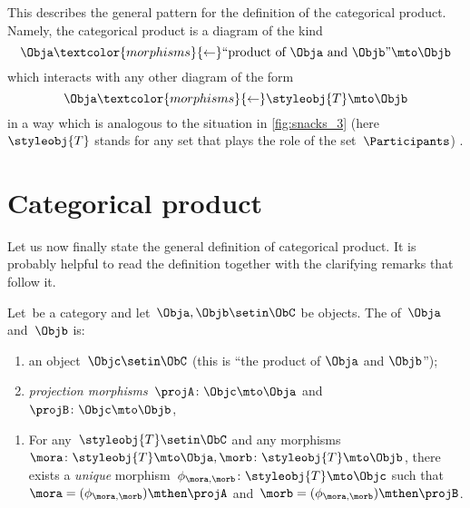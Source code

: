 This describes the general pattern for the definition of the categorical product.
Namely, the categorical product is a diagram of the kind
\begin{equation}
    \label{eq:prod-inline-generic-diagram}
    \Obja \textcolor{morphisms}{\leftarrow} \text{``product of } \Obja \text{ and } \Objb \text{''}  \mto \Objb
\end{equation}
which interacts with any other diagram of the form
\begin{equation}
    \label{eq:prod-inline-test-diagram}
    \Obja \textcolor{morphisms}{\leftarrow}\styleobj{T} \mto \Objb
\end{equation}
in a way which is analogous to the situation in \cref{fig:snacks_3} (here~$\styleobj{T}$ stands for any set that plays the role of the set~$\Participants$) .

\section{Categorical product}


Let us now finally state the general definition of categorical product.
It is probably helpful to read the definition together with the clarifying remarks that follow it.

\begin{ctdefinition}
    \label{def:categorical-product}
    Let~\CatC be a category and let~$\Obja, \Objb \setin \ObC$ be objects.
    The \emph{} of~$\Obja$ and~$\Objb$ is: \\
    \constit
    \begin{enumerate}
        \item an object~$\Objc \setin \ObC$ (this is ``the product of $\Obja$  and $\Objb$'');
        \item \emph{projection morphisms}~$\projA \colon \Objc \mto \Obja$ and~$\projB \colon \Objc \mto \Objb$,
    \end{enumerate}
    \condit
    \begin{enumerate}
        \item For any~$\styleobj{T} \setin \ObC$ and any morphisms~$\mora \colon \styleobj{T} \mto \Obja, \morb \colon \styleobj{T} \mto \Objb$, there exists a \emph{unique} morphism~$\phi_{\mora,\morb} \colon \styleobj{T} \mto \Objc$ such that~$\mora = (\phi_{\mora,
                      \morb})\mthen \projA$ and~$\morb=(\phi_{\mora, \morb})\mthen \projB$.
    \end{enumerate}
\end{ctdefinition}

